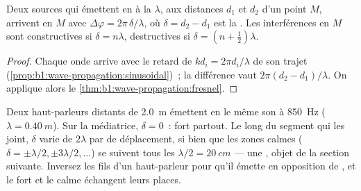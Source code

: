\begin{proposition}\label{prop:b1:wave-propagation:pathdiff}
Deux sources qui émettent en  à la  $\lambda$, aux
distances $d_1$ et $d_2$ d'un point $M$, arrivent en $M$ avec
$\Delta\varphi = 2\pi\,\delta/\lambda$, où $\delta = d_2 - d_1$ est la
\emph{}. Les interférences en $M$ sont constructives
si $\delta = n\lambda$, destructives si $\delta = (n + \tfrac12)\lambda$.
\end{proposition}

\begin{proof}
Chaque onde arrive avec le retard de  $kd_i = 2\pi d_i/\lambda$ de
son trajet (\cref{prop:b1:wave-propagation:sinusoidal})~; la différence
vaut $2\pi(d_2 - d_1)/\lambda$. On applique alors le \cref{thm:b1:wave-propagation:fresnel}.
\end{proof}

\begin{example}\label{ex:b1:wave-propagation:speakers}
Deux haut-parleurs distants de \qty{2.0}{m} émettent en  le même
son à \qty{850}{Hz} ($\lambda = \qty{0.40}{m}$). Sur la médiatrice,
$\delta = 0$~: fort partout. Le long du segment qui les joint, $\delta$
varie de $2\lambda$ par  de déplacement, si bien que les
zones calmes ($\delta = \pm\lambda/2, \pm 3\lambda/2, \dots$) se suivent
tous les $\lambda/2 = \qty{20}{cm}$ --- une , objet de
la section suivante. Inversez les fils d'un haut-parleur pour qu'il
émette en opposition de , et le fort et le calme échangent leurs
places.
\end{example}

